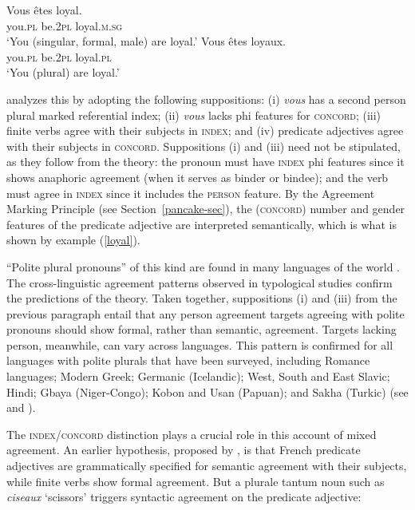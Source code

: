 \documentclass[output=paper
                ,modfonts
                ,nonflat
	        ,collection
	        ,collectionchapter
	        ,collectiontoclongg
 	        ,biblatex
                ,babelshorthands
                ,newtxmath
                ,draftmode
                ,colorlinks, citecolor=brown
]{./langsci/langscibook}
\begin{document}
{\begin{exe} 
\ex\label{loyal}
\begin{xlist}
\ex
\gll   Vous		\^{e}tes		loyal. \\
		you.\textsc{pl}		be.\textsc{2pl}	loyal.\textsc{m.sg} \\
\glt		`You (singular, formal, male) are loyal.’ 
\ex 
\gll	Vous		\^{e}tes		loyaux. \\
		you.\textsc{pl}		be.\textsc{2pl}	loyal.\textsc{pl} \\
\glt		`You (plural) are loyal.’  
\end{xlist}
\end{exe}

\noindent
\citet{Wechsler:2011} analyzes this by adopting the following suppositions: (i) \textit{vous} has a  second person plural marked referential index; (ii) \textit{vous} lacks phi features for \textsc{concord}; (iii) finite verbs agree with their subjects in \textsc{index}; and (iv) predicate adjectives agree with their subjects in \textsc{concord}.  Suppositions (i) and (iii) need not be stipulated, as they follow from the theory:  the pronoun must have \textsc{index} phi features since it shows anaphoric agreement (when it serves as binder or bindee); and the verb must agree in \textsc{index} since it includes the \textsc{person} feature.  By the Agreement Marking Principle (see Section~\ref{pancake-sec}), the (\textsc{concord}) number and gender features of the predicate adjective are interpreted semantically, which is what is shown by example (\ref{loyal}). 

``Polite plural pronouns'' of this kind are found in many languages of the world \citep{Head:1978}.   The cross-linguistic agreement patterns observed in typological studies \citep{Comrie:1975,Wechsler:2011} confirm the predictions of the theory.  Taken together, suppositions (i) and (iii) from the previous paragraph entail that any person agreement targets agreeing with polite pronouns should show formal, rather than semantic, agreement.  Targets lacking person, meanwhile, can vary across languages.  This pattern is confirmed for all languages with polite plurals that have been surveyed, including Romance languages; Modern Greek; Germanic (Icelandic); West, South and East Slavic; Hindi; Gbaya (Niger-Congo);  Kobon and Usan (Papuan); and Sakha (Turkic) (see \citealt{Comrie:1975} and \citealt{Wechsler:2011}).   
 
The \textsc{index/concord} distinction plays a crucial role in this account of mixed agreement.  An earlier hypothesis, proposed by \citet{Kathol99b}, is that French predicate adjectives are grammatically specified for semantic  agreement with their subjects, while finite verbs show formal agreement.  But a plurale tantum noun such as \textit{ciseaux} `scissors’ triggers syntactic agreement on the predicate adjective:
	
}
\end{document}
